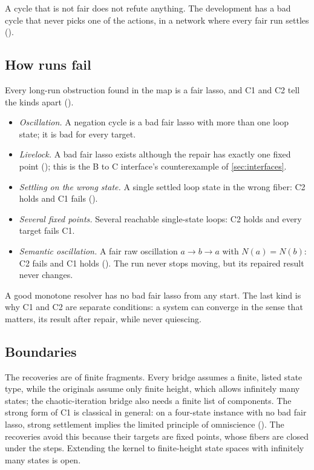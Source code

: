 A cycle that is not fair does not refute anything. The development has a bad cycle that never picks
one of the actions, in a network where every fair run settles
().

\subsection{How runs fail}

Every long-run obstruction found in the map is a fair lasso, and C1 and C2 tell the kinds apart
().

\begin{itemize}[nosep]
  \item \emph{Oscillation.} A negation cycle is a bad fair lasso with more than one loop state; it is
    bad for every target.
  \item \emph{Livelock.} A bad fair lasso exists although the repair has exactly one fixed point
    (); this is the B to C interface's counterexample of \cref{sec:interfaces}.
  \item \emph{Settling on the wrong state.} A single settled loop state in the wrong fiber: C2 holds and
    C1 fails ().
  \item \emph{Several fixed points.} Several reachable single-state loops: C2 holds and every target
    fails C1.
  \item \emph{Semantic oscillation.} A fair raw oscillation $a \to b \to a$ with $N(a) = N(b)$: C2 fails
    and C1 holds (). The run never stops moving, but its repaired result
    never changes.
\end{itemize}

\noindent
A good monotone resolver has no bad fair lasso from any start. The last kind is why C1 and C2 are
separate conditions: a system can converge in the sense that matters, its result after repair, while
never quiescing.

\subsection{Boundaries}

The recoveries are of finite fragments. Every bridge assumes a finite, listed state type, while the
originals assume only finite height, which allows infinitely many states; the chaotic-iteration bridge
also needs a finite list of components. The strong form of C1 is classical in general: on a four-state
instance with no bad fair lasso, strong settlement implies the limited principle of omniscience
(). The recoveries avoid this because their targets are fixed points, whose fibers are
closed under the steps. Extending the kernel to finite-height state spaces with infinitely many states
is open.
